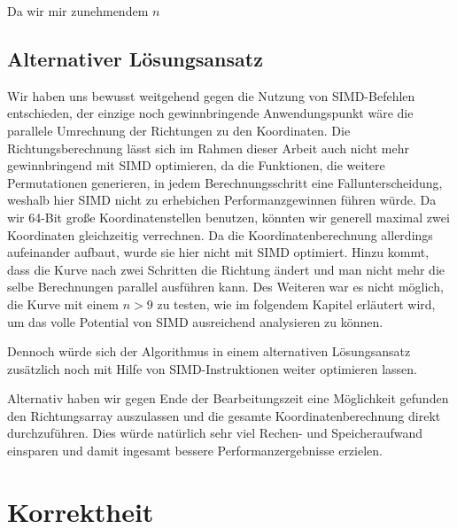 \documentclass[course=asp]{aspdoc}
\begin{document}

Da wir mir zunehmendem $n$ 


\subsection{Alternativer L\"osungsansatz} \label{Alternativer L\"osungsansatz}

Wir haben uns bewusst weitgehend gegen die Nutzung von SIMD-Befehlen entschieden, der einzige noch gewinnbringende Anwendungspunkt w\"are die parallele Umrechnung der Richtungen zu den Koordinaten. Die Richtungsberechnung l\"asst sich im Rahmen dieser Arbeit auch nicht mehr gewinnbringend mit SIMD optimieren, da die Funktionen, die weitere Permutationen generieren, in jedem Berechnungsschritt eine Fallunterscheidung, weshalb hier SIMD nicht zu erhebichen Performanzgewinnen f\"uhren w\"urde. 
Da wir 64-Bit gro\ss e Koordinatenstellen benutzen, k\"onnten wir generell maximal zwei Koordinaten gleichzeitig verrechnen. Da die Koordinatenberechnung allerdings aufeinander aufbaut, wurde sie hier nicht mit SIMD optimiert. Hinzu kommt, dass die Kurve nach zwei Schritten die Richtung \"andert und man nicht mehr die selbe Berechnungen parallel ausf\"uhren kann. Des Weiteren war es nicht m\"oglich, die Kurve mit einem $n > 9$ zu testen, wie im folgendem Kapitel erl\"autert wird, um das volle Potential von SIMD ausreichend analysieren zu k\"onnen.

Dennoch w\"urde sich der Algorithmus in einem alternativen L\"osungsansatz zus\"atzlich noch mit Hilfe von SIMD-Instruktionen weiter optimieren lassen.  

Alternativ haben wir gegen Ende der Bearbeitungszeit eine M\"oglichkeit gefunden den Richtungsarray auszulassen und die gesamte Koordinatenberechnung direkt durchzuf\"uhren. Dies w\"urde nat\"urlich sehr viel Rechen- und Speicheraufwand einsparen und damit ingesamt bessere Performanzergebnisse erzielen.

\newpage

\section{Korrektheit} \label{Korrektheit} %
\end{document}
